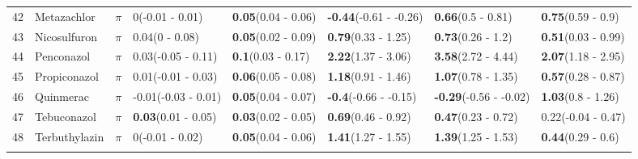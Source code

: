 \begin{longtable}{lp{2cm}p{0.7cm}p{2cm}p{2cm}p{2cm}p{2cm}p{2cm}}
  42 & Metazachlor & $\pi$ & 0\newline (-0.01 - 0.01) & \textbf{0.05}\newline (0.04 - 0.06) & \textbf{-0.44}\newline (-0.61 - -0.26) & \textbf{0.66}\newline (0.5 - 0.81) & \textbf{0.75}\newline (0.59 - 0.9) \\ 
  43 & Nicosulfuron & $\pi$ & 0.04\newline (0 - 0.08) & \textbf{0.05}\newline (0.02 - 0.09) & \textbf{0.79}\newline (0.33 - 1.25) & \textbf{0.73}\newline (0.26 - 1.2) & \textbf{0.51}\newline (0.03 - 0.99) \\ 
  44 & Penconazol & $\pi$ & 0.03\newline (-0.05 - 0.11) & \textbf{0.1}\newline (0.03 - 0.17) & \textbf{2.22}\newline (1.37 - 3.06) & \textbf{3.58}\newline (2.72 - 4.44) & \textbf{2.07}\newline (1.18 - 2.95) \\ 
  45 & Propiconazol & $\pi$ & 0.01\newline (-0.01 - 0.03) & \textbf{0.06}\newline (0.05 - 0.08) & \textbf{1.18}\newline (0.91 - 1.46) & \textbf{1.07}\newline (0.78 - 1.35) & \textbf{0.57}\newline (0.28 - 0.87) \\ 
  46 & Quinmerac & $\pi$ & -0.01\newline (-0.03 - 0.01) & \textbf{0.05}\newline (0.04 - 0.07) & \textbf{-0.4}\newline (-0.66 - -0.15) & \textbf{-0.29}\newline (-0.56 - -0.02) & \textbf{1.03}\newline (0.8 - 1.26) \\ 
  47 & Tebuconazol & $\pi$ & \textbf{0.03}\newline (0.01 - 0.05) & \textbf{0.03}\newline (0.02 - 0.05) & \textbf{0.69}\newline (0.46 - 0.92) & \textbf{0.47}\newline (0.23 - 0.72) & 0.22\newline (-0.04 - 0.47) \\ 
  48 & Terbuthylazin & $\pi$ & 0\newline (-0.01 - 0.02) & \textbf{0.05}\newline (0.04 - 0.06) & \textbf{1.41}\newline (1.27 - 1.55) & \textbf{1.39}\newline (1.25 - 1.53) & \textbf{0.44}\newline (0.29 - 0.6) \\ 
   \bottomrule
\label{tab:var_model_coef}
\end{longtable}
\endgroup
